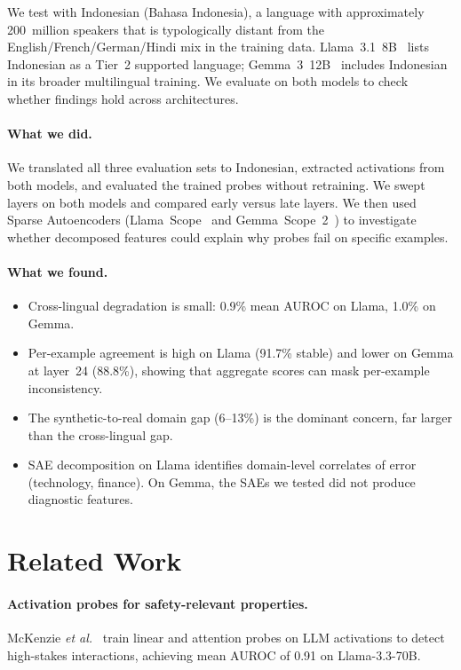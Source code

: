 \documentclass{article}
\newcommand{\etal}{\textit{et al.}\xspace}
\newcommand{\auroc}{AUROC\xspace}
\newcommand{\llama}{Llama~3.1~8B\xspace}
\newcommand{\gemma}{Gemma~3~12B\xspace}
\begin{document}
We test with Indonesian (Bahasa Indonesia), a language with approximately
200~million speakers that is typologically distant from the
English/French/German/Hindi mix in the training data.
\llama~\cite{llama3} lists Indonesian as a Tier~2 supported language;
\gemma~\cite{gemma3} includes Indonesian in its broader multilingual training.
We evaluate on both models to check whether findings hold across architectures.

\paragraph{What we did.}
We translated all three evaluation sets to Indonesian, extracted activations
from both models, and evaluated the trained probes without retraining.
We swept layers on both models and compared early versus late layers.
We then used Sparse Autoencoders (Llama~Scope~\cite{llamascope} and
Gemma~Scope~2~\cite{gemma_scope2}) to investigate whether decomposed features
could explain why probes fail on specific examples.

\paragraph{What we found.}
\begin{itemize}[nosep]
  \item Cross-lingual degradation is small: 0.9\% mean \auroc on Llama,
        1.0\% on Gemma.
  \item Per-example agreement is high on Llama (91.7\% stable) and
        lower on Gemma at layer~24 (88.8\%), showing that
        aggregate scores can mask per-example inconsistency.
  \item The synthetic-to-real domain gap (6--13\%) is the dominant concern,
        far larger than the cross-lingual gap.
  \item SAE decomposition on Llama identifies domain-level correlates of
        error (technology, finance).
        On Gemma, the SAEs we tested did not produce diagnostic features.
\end{itemize}

\section{Related Work}
\label{sec:related}

\paragraph{Activation probes for safety-relevant properties.}
McKenzie \etal~\cite{mckenzie2025} train linear and attention probes on
LLM activations to detect high-stakes interactions, achieving mean AUROC of
0.91 on Llama-3.3-70B.
\end{document}

